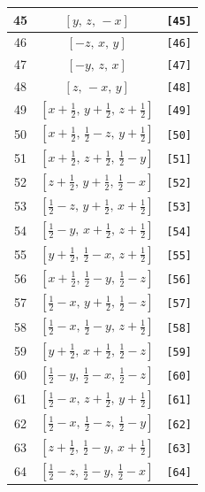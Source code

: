 \documentclass[fleqn,8pt]{jsarticle}
\begin{document}
\begin{longtable}{ccc}
45 & $\left[ y,\, z,\, - x \right]$ & {\tt [45]} \\ \hline
46 & $\left[ - z,\, x,\, y \right]$ & {\tt [46]} \\ \hline
47 & $\left[ - y,\, z,\, x \right]$ & {\tt [47]} \\ \hline
48 & $\left[ z,\, - x,\, y \right]$ & {\tt [48]} \\ \hline
49 & $\left[ x + \frac{1}{2},\, y + \frac{1}{2},\, z + \frac{1}{2} \right]$ & {\tt [49]} \\ \hline
50 & $\left[ x + \frac{1}{2},\, \frac{1}{2} - z,\, y + \frac{1}{2} \right]$ & {\tt [50]} \\ \hline
51 & $\left[ x + \frac{1}{2},\, z + \frac{1}{2},\, \frac{1}{2} - y \right]$ & {\tt [51]} \\ \hline
52 & $\left[ z + \frac{1}{2},\, y + \frac{1}{2},\, \frac{1}{2} - x \right]$ & {\tt [52]} \\ \hline
53 & $\left[ \frac{1}{2} - z,\, y + \frac{1}{2},\, x + \frac{1}{2} \right]$ & {\tt [53]} \\ \hline
54 & $\left[ \frac{1}{2} - y,\, x + \frac{1}{2},\, z + \frac{1}{2} \right]$ & {\tt [54]} \\ \hline
55 & $\left[ y + \frac{1}{2},\, \frac{1}{2} - x,\, z + \frac{1}{2} \right]$ & {\tt [55]} \\ \hline
56 & $\left[ x + \frac{1}{2},\, \frac{1}{2} - y,\, \frac{1}{2} - z \right]$ & {\tt [56]} \\ \hline
57 & $\left[ \frac{1}{2} - x,\, y + \frac{1}{2},\, \frac{1}{2} - z \right]$ & {\tt [57]} \\ \hline
58 & $\left[ \frac{1}{2} - x,\, \frac{1}{2} - y,\, z + \frac{1}{2} \right]$ & {\tt [58]} \\ \hline
59 & $\left[ y + \frac{1}{2},\, x + \frac{1}{2},\, \frac{1}{2} - z \right]$ & {\tt [59]} \\ \hline
60 & $\left[ \frac{1}{2} - y,\, \frac{1}{2} - x,\, \frac{1}{2} - z \right]$ & {\tt [60]} \\ \hline
61 & $\left[ \frac{1}{2} - x,\, z + \frac{1}{2},\, y + \frac{1}{2} \right]$ & {\tt [61]} \\ \hline
62 & $\left[ \frac{1}{2} - x,\, \frac{1}{2} - z,\, \frac{1}{2} - y \right]$ & {\tt [62]} \\ \hline
63 & $\left[ z + \frac{1}{2},\, \frac{1}{2} - y,\, x + \frac{1}{2} \right]$ & {\tt [63]} \\ \hline
64 & $\left[ \frac{1}{2} - z,\, \frac{1}{2} - y,\, \frac{1}{2} - x \right]$ & {\tt [64]} \\ \hline

\end{longtable}
\end{document}
